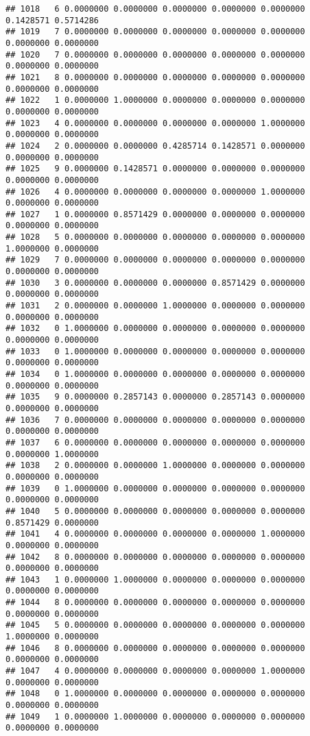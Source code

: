 \documentclass[
]{article}
\begin{document}
\begin{verbatim}
## 1018   6 0.0000000 0.0000000 0.0000000 0.0000000 0.0000000 0.1428571 0.5714286
## 1019   7 0.0000000 0.0000000 0.0000000 0.0000000 0.0000000 0.0000000 0.0000000
## 1020   7 0.0000000 0.0000000 0.0000000 0.0000000 0.0000000 0.0000000 0.0000000
## 1021   8 0.0000000 0.0000000 0.0000000 0.0000000 0.0000000 0.0000000 0.0000000
## 1022   1 0.0000000 1.0000000 0.0000000 0.0000000 0.0000000 0.0000000 0.0000000
## 1023   4 0.0000000 0.0000000 0.0000000 0.0000000 1.0000000 0.0000000 0.0000000
## 1024   2 0.0000000 0.0000000 0.4285714 0.1428571 0.0000000 0.0000000 0.0000000
## 1025   9 0.0000000 0.1428571 0.0000000 0.0000000 0.0000000 0.0000000 0.0000000
## 1026   4 0.0000000 0.0000000 0.0000000 0.0000000 1.0000000 0.0000000 0.0000000
## 1027   1 0.0000000 0.8571429 0.0000000 0.0000000 0.0000000 0.0000000 0.0000000
## 1028   5 0.0000000 0.0000000 0.0000000 0.0000000 0.0000000 1.0000000 0.0000000
## 1029   7 0.0000000 0.0000000 0.0000000 0.0000000 0.0000000 0.0000000 0.0000000
## 1030   3 0.0000000 0.0000000 0.0000000 0.8571429 0.0000000 0.0000000 0.0000000
## 1031   2 0.0000000 0.0000000 1.0000000 0.0000000 0.0000000 0.0000000 0.0000000
## 1032   0 1.0000000 0.0000000 0.0000000 0.0000000 0.0000000 0.0000000 0.0000000
## 1033   0 1.0000000 0.0000000 0.0000000 0.0000000 0.0000000 0.0000000 0.0000000
## 1034   0 1.0000000 0.0000000 0.0000000 0.0000000 0.0000000 0.0000000 0.0000000
## 1035   9 0.0000000 0.2857143 0.0000000 0.2857143 0.0000000 0.0000000 0.0000000
## 1036   7 0.0000000 0.0000000 0.0000000 0.0000000 0.0000000 0.0000000 0.0000000
## 1037   6 0.0000000 0.0000000 0.0000000 0.0000000 0.0000000 0.0000000 1.0000000
## 1038   2 0.0000000 0.0000000 1.0000000 0.0000000 0.0000000 0.0000000 0.0000000
## 1039   0 1.0000000 0.0000000 0.0000000 0.0000000 0.0000000 0.0000000 0.0000000
## 1040   5 0.0000000 0.0000000 0.0000000 0.0000000 0.0000000 0.8571429 0.0000000
## 1041   4 0.0000000 0.0000000 0.0000000 0.0000000 1.0000000 0.0000000 0.0000000
## 1042   8 0.0000000 0.0000000 0.0000000 0.0000000 0.0000000 0.0000000 0.0000000
## 1043   1 0.0000000 1.0000000 0.0000000 0.0000000 0.0000000 0.0000000 0.0000000
## 1044   8 0.0000000 0.0000000 0.0000000 0.0000000 0.0000000 0.0000000 0.0000000
## 1045   5 0.0000000 0.0000000 0.0000000 0.0000000 0.0000000 1.0000000 0.0000000
## 1046   8 0.0000000 0.0000000 0.0000000 0.0000000 0.0000000 0.0000000 0.0000000
## 1047   4 0.0000000 0.0000000 0.0000000 0.0000000 1.0000000 0.0000000 0.0000000
## 1048   0 1.0000000 0.0000000 0.0000000 0.0000000 0.0000000 0.0000000 0.0000000
## 1049   1 0.0000000 1.0000000 0.0000000 0.0000000 0.0000000 0.0000000 0.0000000

\end{verbatim}
\end{document}
